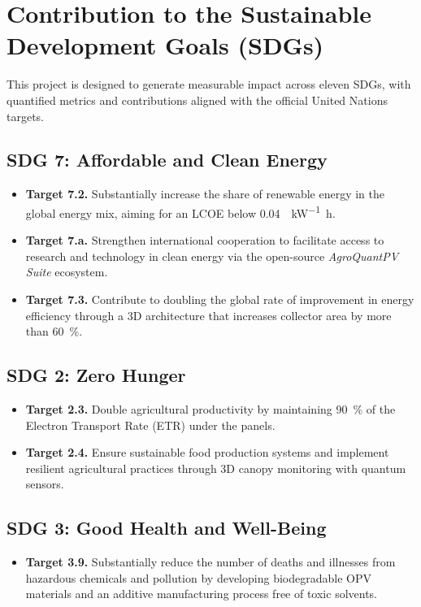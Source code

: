 \documentclass[12pt, a4paper]{article}
\begin{document}
\section{Contribution to the Sustainable Development Goals (SDGs)}

This project is designed to generate measurable impact across eleven SDGs, with quantified metrics and contributions aligned with the official United Nations targets.

\subsection{SDG 7: Affordable and Clean Energy}
\begin{itemize}
    \item \textbf{Target 7.2.} Substantially increase the share of renewable energy in the global energy mix, aiming for an LCOE below \SI{0.04}{\dollar\per\kilo\watt\hour}.

    \item \textbf{Target 7.a.} Strengthen international cooperation to facilitate access to research and technology in clean energy via the open-source \textit{AgroQuantPV Suite} ecosystem.

    \item \textbf{Target 7.3.} Contribute to doubling the global rate of improvement in energy efficiency through a 3D architecture that increases collector area by more than \SI{60}{\percent}.
\end{itemize}

\subsection{SDG 2: Zero Hunger}
\begin{itemize}
    \item \textbf{Target 2.3.} Double agricultural productivity by maintaining \SI{90}{\percent} of the Electron Transport Rate (ETR) under the panels.

    \item \textbf{Target 2.4.} Ensure sustainable food production systems and implement resilient agricultural practices through 3D canopy monitoring with quantum sensors.
\end{itemize}

\subsection{SDG 3: Good Health and Well-Being}
\begin{itemize}
    \item \textbf{Target 3.9.} Substantially reduce the number of deaths and illnesses from hazardous chemicals and pollution by developing biodegradable OPV materials and an additive manufacturing process free of toxic solvents.
\end{itemize}
\end{document}
